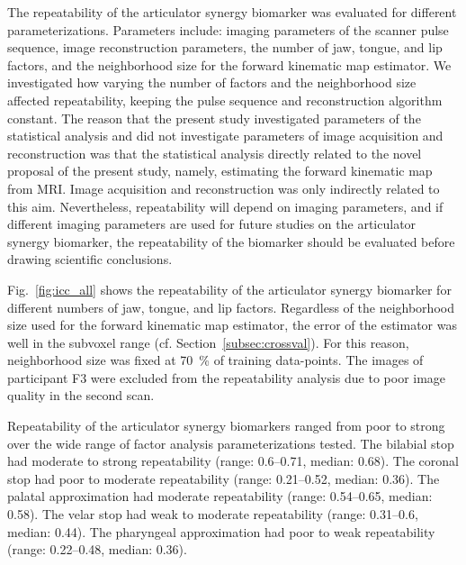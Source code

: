 \documentclass[preprint]{JASAnew}\usepackage[]{graphicx}\usepackage[]{color}
\begin{document}
The repeatability of the articulator synergy biomarker was evaluated for different parameterizations. 
%
Parameters include: imaging parameters of the scanner pulse sequence, image reconstruction parameters, the number of jaw, tongue, and lip factors, and the neighborhood size for the forward kinematic map estimator.
%
We investigated how varying the number of factors and the neighborhood size affected repeatability, keeping the pulse sequence and reconstruction algorithm constant. 
%
The reason that the present study investigated parameters of the statistical analysis and did not investigate parameters of image acquisition and reconstruction was that the statistical analysis directly related to the novel proposal of the present study, namely, estimating the forward kinematic map from MRI. Image acquisition and reconstruction was only indirectly related to this aim. 
%
Nevertheless, repeatability will depend on imaging parameters, and if different imaging parameters are used for future studies on the articulator synergy biomarker, the repeatability of the biomarker should be evaluated before drawing scientific conclusions. 

Fig.~\ref{fig:icc_all} shows the repeatability of the articulator synergy biomarker for different numbers of jaw, tongue, and lip factors. 
%
Regardless of the neighborhood size used for the forward kinematic map estimator, the error of the estimator was well in the subvoxel range (cf. Section~\ref{subsec:crossval}). For this reason, neighborhood size was fixed at \SI{70}{\percent} of training data-points. 
%
The images of participant F3 were excluded from the repeatability analysis due to poor image quality in the second scan. 



Repeatability of the articulator synergy biomarkers ranged from poor to strong over the wide range of factor analysis parameterizations tested. 
%
%
The bilabial stop had
moderate  to  strong
repeatability
(range: \numrange{0.6}{0.71},
median: \num{0.68}). 
%
% 
The coronal stop had
poor  to  moderate
repeatability
(range: \numrange{0.21}{0.52},
median: \num{0.36}). 
%
%
The palatal approximation had
moderate
repeatability
(range: \numrange{0.54}{0.65},
median: \num{0.58}). 
%
%
The velar stop had
weak  to  moderate
repeatability
(range: \numrange{0.31}{0.6},
median: \num{0.44}). 
%
%
The pharyngeal approximation had 
poor  to  weak
repeatability
(range: \numrange{0.22}{0.48},
median: \num{0.36}). 
\end{document}
